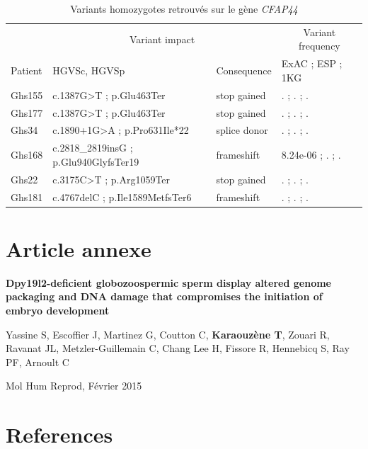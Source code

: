 \documentclass[12pt,a4paper,twoside]{ugathesis}
\theoremstyle{definition}
\theoremstyle{definition}
\theoremstyle{definition}
\theoremstyle{remark}
\begin{document}
\begin{longtable}[t]{llll}
\caption{\label{tab:tabcfap44}Variants homozygotes retrouvés sur le gène \textit{CFAP44}}\\
\toprule
\multicolumn{1}{c}{ } & \multicolumn{2}{c}{Variant impact} & \multicolumn{1}{c}{Variant frequency} \\
\cmidrule(l{2pt}r{2pt}){2-3} \cmidrule(l{2pt}r{2pt}){4-4}
Patient & HGVSc, HGVSp & Consequence & ExAC ; ESP ; 1KG\\
\midrule
Ghs155 & c.1387G>T ; p.Glu463Ter & stop gained & . ; . ; .\\
Ghs177 & c.1387G>T ; p.Glu463Ter & stop gained & . ; . ; .\\
Ghs34 & c.1890+1G>A ; p.Pro631Ile*22 & splice donor & . ; . ; .\\
Ghs168 & c.2818\_2819insG ; p.Glu940GlyfsTer19 & frameshift & 8.24e-06 ; . ; .\\
Ghs22 & c.3175C>T ; p.Arg1059Ter & stop gained & . ; . ; .\\
Ghs181 & c.4767delC ; p.Ile1589MetfsTer6 & frameshift & . ; . ; .\\
\bottomrule
\end{longtable}

\hypertarget{dpy2015}{\chapter{Article annexe}\label{dpy2015}}

\textbf{Dpy19l2-deficient globozoospermic sperm display altered genome
packaging and DNA damage that compromises the initiation of embryo
development}

Yassine S, Escoffier J, Martinez G, Coutton C, \textbf{Karaouzène T},
Zouari R, Ravanat JL, Metzler-Guillemain C, Chang Lee H, Fissore R,
Hennebicq S, Ray PF, Arnoult C

Mol Hum Reprod, Février 2015

\newpage



\newpage

\backmatter

\chapter*{References}\label{references}

\noindent

\setlength{\parindent}{-0.20in} \setlength{\leftskip}{0.20in}
\setlength{\parskip}{8pt}
\end{document}
